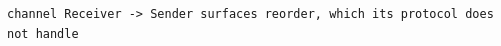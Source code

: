 \begin{lstlisting}[language={}]
channel Receiver -> Sender surfaces reorder, which its protocol does not handle
\end{lstlisting}
